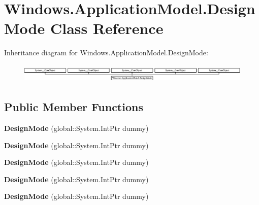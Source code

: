 \hypertarget{class_windows_1_1_application_model_1_1_design_mode}{}\section{Windows.\+Application\+Model.\+Design\+Mode Class Reference}
\label{class_windows_1_1_application_model_1_1_design_mode}
Inheritance diagram for Windows.\+Application\+Model.\+Design\+Mode\+:\begin{figure}[H]
\begin{center}
\leavevmode
\includegraphics[height=0.906883cm]{class_windows_1_1_application_model_1_1_design_mode}
\end{center}
\end{figure}
\subsection*{Public Member Functions}
\begin{DoxyCompactItemize}
\item 
\mbox{\label{class_windows_1_1_application_model_1_1_design_mode_afa2ecaba9fffcb9dc9ec0b5927487dcc}} 
{\bfseries Design\+Mode} (global\+::\+System.\+Int\+Ptr dummy)
\item 
\mbox{\label{class_windows_1_1_application_model_1_1_design_mode_afa2ecaba9fffcb9dc9ec0b5927487dcc}} 
{\bfseries Design\+Mode} (global\+::\+System.\+Int\+Ptr dummy)
\item 
\mbox{\label{class_windows_1_1_application_model_1_1_design_mode_afa2ecaba9fffcb9dc9ec0b5927487dcc}} 
{\bfseries Design\+Mode} (global\+::\+System.\+Int\+Ptr dummy)
\item 
\mbox{\label{class_windows_1_1_application_model_1_1_design_mode_afa2ecaba9fffcb9dc9ec0b5927487dcc}} 
{\bfseries Design\+Mode} (global\+::\+System.\+Int\+Ptr dummy)
\item 
\mbox{\label{class_windows_1_1_application_model_1_1_design_mode_afa2ecaba9fffcb9dc9ec0b5927487dcc}} 
{\bfseries Design\+Mode} (global\+::\+System.\+Int\+Ptr dummy)
\end{DoxyCompactItemize}

